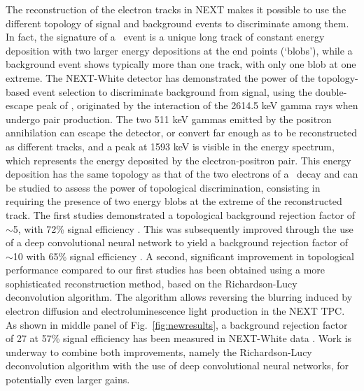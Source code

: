 The reconstruction of the electron tracks in NEXT makes it possible to use the different topology of signal and background events to discriminate among them. In fact, the signature of a \bbonu ~event is a unique long track of constant energy deposition with two larger energy depositions at the end points (‘blobs’), while a background event shows typically more than one track, with only one blob at one extreme. 
The NEXT-White detector has demonstrated the power of the topology-based event selection to discriminate background from signal, using the double-escape peak of , originated by the interaction of the 2614.5 keV gamma rays when undergo pair production. The two 511 keV gammas emitted by the positron annihilation can escape the detector, or convert far enough as to be reconstructed as different tracks, and a peak at 1593 keV is visible in the energy spectrum, which represents the energy deposited by the electron-positron pair.  This energy deposition has the same topology as that of the two electrons of a \bbonu ~decay and can be studied to assess the power of topological discrimination, consisting in requiring the presence of two energy blobs at the extreme of the reconstructed track.  The first studies demonstrated a topological background rejection factor of $\sim$5, with 72\% signal efficiency \cite{Ferrario:2019kwg}. This was subsequently improved through the use of a deep convolutional neural network to yield a background rejection factor of  $\sim$10 with 65\% signal efficiency \cite{NEXT:2020jmz}. A second, significant improvement in topological performance compared to our first studies has been obtained using a more sophisticated reconstruction method, based on the Richardson-Lucy deconvolution algorithm. The algorithm allows reversing the blurring induced by electron diffusion and electroluminescence light production in the NEXT TPC. As shown in middle panel of Fig.~\ref{fig:newresults}, a  background rejection factor of 27 at 57\% signal efficiency has been measured in NEXT-White data \cite{NEXT:2021pjq}. Work is underway to combine both improvements, namely the Richardson-Lucy deconvolution algorithm with the use of deep convolutional neural networks, for potentially even larger gains.


